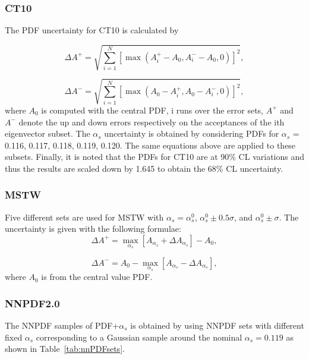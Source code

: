 \subsubsection{CT10}
The PDF uncertainty for CT10 is calculated by

\begin{equation}
\Delta A^{+} = \sqrt{ \displaystyle \sum \limits_{i=1}^N [	\max(A_i^{+} - A_0, A_i^{-} - A_0, 0) ] ^ 2},
\end{equation}

\begin{equation}
\Delta A^{-} = \sqrt{ \displaystyle \sum \limits_{i=1}^N [	\max(A_0 - A_i^{+}, A_0 - A_i^{-} , 0) ] ^ 2},
\end{equation}
where $A_0$ is computed with the central PDF, i runs over the error sets, $A^{+}$ and $A^{-}$ denote the up and down errors respectively on the acceptances of the ith eigenvector subset. The $\alpha _s$ uncertainty is obtained by considering PDFs for $\alpha _s$ = 0.116, 0.117, 0.118, 0.119, 0.120. The same equations above are applied to these subsets. Finally, it is noted that the PDFs for CT10 are at 90\% CL variations and thus the results are scaled down by 1.645 to obtain the 68\% CL uncertainty.
	
\subsubsection{MSTW}
Five different sets are used for MSTW with $\alpha _s = \alpha _s ^ 0$, $\alpha _s ^ 0 \pm 0.5 \sigma$, and $\alpha _s ^ 0 \pm \sigma$. The uncertainty is given with the following formulae:
\begin{equation}
\Delta A^{+} = \underset{\alpha _s}{\max} [ A_{\alpha _ s} + \Delta A_{\alpha _s} ]  - A_0,  
\end{equation}

\begin{equation}
\Delta A^{-} = A_0 -  \underset{\alpha _s}{\max} [ A_{\alpha _ s} - \Delta A_{\alpha _s} ], 
\end{equation}
where $A_0$ is from the central value PDF.\\

\subsubsection{NNPDF2.0}
The NNPDF samples of PDF+$\alpha _s$ is obtained by using NNPDF sets with different fixed $\alpha _s$ corresponding to a Gaussian sample around the nominal $\alpha _s = 0.119$ as shown in Table~\ref{tab:nnPDFsets}.
 

